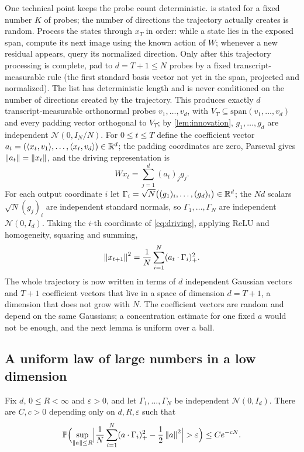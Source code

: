 One technical point keeps the probe count deterministic.  is stated for a fixed number $K$ of probes; the number of directions the trajectory actually creates is random. Process the states through $x_T$ in order: while a state lies in the exposed span, compute its next image using the known action of $W$; whenever a new residual appears, query its normalized direction. Only after this trajectory processing is complete, pad to $d=T+1\le N$ probes by a fixed transcript-measurable rule (the first standard basis vector not yet in the span, projected and normalized). The list has deterministic length and is never conditioned on the number of directions created by the trajectory. This produces exactly $d$ transcript-measurable orthonormal probes $v_1,\dots,v_d$, with $V_T\subseteq\mathrm{span}(v_1,\dots,v_d)$ and every padding vector orthogonal to $V_T$; by \cref{lem:innovation}, $g_1,\dots,g_d$ are independent $\mathcal N(0,I_N/N)$. For $0\le t\le T$ define the coefficient vector $a_t=(\langle x_t,v_1\rangle,\dots,\langle x_t,v_d\rangle)\in\mathbb{R}^d$; the padding coordinates are zero, Parseval gives $\left\lVert a_t\right\rVert=\left\lVert x_t\right\rVert$, and the driving representation is
\begin{equation}\label{eq:driving}
Wx_t=\sum_{j=1}^d(a_t)_jg_j .
\end{equation}
For each output coordinate $i$ let $\Gamma_i=\sqrt N\bigl((g_1)_i,\dots,(g_d)_i\bigr)\in\mathbb{R}^d$; the $Nd$ scalars $\sqrt N(g_j)_i$ are independent standard normals, so $\Gamma_1,\dots,\Gamma_N$ are independent $\mathcal N(0,I_d)$. Taking the $i$-th coordinate of \cref{eq:driving}, applying ReLU and homogeneity, squaring and summing,
\begin{equation}\label{eq:onestep}
\left\lVert x_{t+1}\right\rVert^2=\frac1N\sum_{i=1}^N(a_t\cdot\Gamma_i)_+^2 .
\end{equation}
The whole trajectory is now written in terms of $d$ independent Gaussian vectors and $T+1$ coefficient vectors that live in a space of dimension $d=T+1$, a dimension that does not grow with $N$. The coefficient vectors are random and depend on the same Gaussians; a concentration estimate for one fixed $a$ would not be enough, and the next lemma is uniform over a ball.

\subsection{A uniform law of large numbers in a low dimension}

\begin{lemma}\label{lem:ulln}
Fix $d$, $0\le R<\infty$ and $\varepsilon>0$, and let $\Gamma_1,\dots,\Gamma_N$ be independent $\mathcal N(0,I_d)$. There are $C,c>0$ depending only on $d,R,\varepsilon$ such that
\[
\PP\Bigl(\sup_{\norm a\le R}\Bigl|\frac1N\sum_{i=1}^N(a\cdot\Gamma_i)_+^2-\frac12\norm a^2\Bigr|>\varepsilon\Bigr)\le Ce^{-cN}.
\]
\end{lemma}

